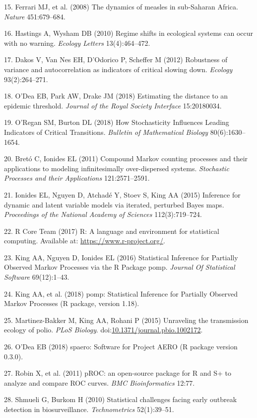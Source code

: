 \documentclass[3p]{elsarticle} %
\begin{document}
\leavevmode\hypertarget{ref-Ferrari2008}{}%
15. Ferrari MJ, et al. (2008) The dynamics of measles in sub-Saharan
Africa. \emph{Nature} 451:679--684.

\leavevmode\hypertarget{ref-Hastings2010}{}%
16. Hastings A, Wysham DB (2010) Regime shifts in ecological systems can
occur with no warning. \emph{Ecology Letters} 13(4):464--472.

\leavevmode\hypertarget{ref-Dakos2012a}{}%
17. Dakos V, Van Nes EH, D'Odorico P, Scheffer M (2012) Robustness of
variance and autocorrelation as indicators of critical slowing down.
\emph{Ecology} 93(2):264--271.

\leavevmode\hypertarget{ref-ODea2018a}{}%
18. O'Dea EB, Park AW, Drake JM (2018) Estimating the distance to an
epidemic threshold. \emph{Journal of the Royal Society Interface}
15:20180034.

\leavevmode\hypertarget{ref-ORegan2018}{}%
19. O'Regan SM, Burton DL (2018) How Stochasticity Influences Leading
Indicators of Critical Transitions. \emph{Bulletin of Mathematical
Biology} 80(6):1630--1654.

\leavevmode\hypertarget{ref-Breto2011}{}%
20. Bretó C, Ionides EL (2011) Compound Markov counting processes and
their applications to modeling infinitesimally over-dispersed systems.
\emph{Stochastic Processes and their Applications} 121:2571--2591.

\leavevmode\hypertarget{ref-Ionides2015}{}%
21. Ionides EL, Nguyen D, Atchadé Y, Stoev S, King AA (2015) Inference
for dynamic and latent variable models via iterated, perturbed Bayes
maps. \emph{Proceedings of the National Academy of Sciences}
112(3):719--724.

\leavevmode\hypertarget{ref-R2017}{}%
22. R Core Team (2017) R: A language and environment for statistical
computing. Available at: \url{https://www.r-project.org/}.

\leavevmode\hypertarget{ref-King2016}{}%
23. King AA, Nguyen D, Ionides EL (2016) Statistical Inference for
Partially Observed Markov Processes via the R Package pomp.
\emph{Journal Of Statistical Software} 69(12):1--43.

\leavevmode\hypertarget{ref-King2018}{}%
24. King AA, et al. (2018) pomp: Statistical Inference for Partially
Observed Markov Processes (R package, version 1.18).

\leavevmode\hypertarget{ref-Martinez-Bakker2015}{}%
25. Martinez-Bakker M, King AA, Rohani P (2015) Unraveling the
transmission ecology of polio. \emph{PLoS Biology}.
doi:\href{https://doi.org/10.1371/journal.pbio.1002172}{10.1371/journal.pbio.1002172}.

\leavevmode\hypertarget{ref-ODea2018}{}%
26. O'Dea EB (2018) spaero: Software for Project AERO (R package version
0.3.0).

\leavevmode\hypertarget{ref-Robin2011}{}%
27. Robin X, et al. (2011) pROC: an open-source package for R and S+ to
analyze and compare ROC curves. \emph{BMC Bioinformatics} 12:77.

\leavevmode\hypertarget{ref-Shmueli2010}{}%
28. Shmueli G, Burkom H (2010) Statistical challenges facing early
outbreak detection in biosurveillance. \emph{Technometrics}
52(1):39--51.
\end{document}
